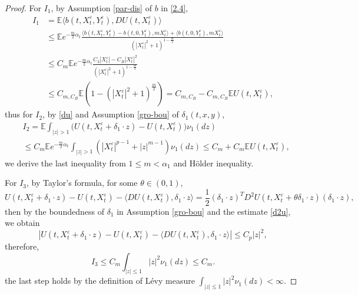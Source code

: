 \documentclass[11pt,reqno]{amsart}
\numberwithin{equation}{section}
\begin{document}
\begin{proof}
For $I_{1}$, by  Assumption \ref{par-dis} of $b$ in  \eqref{2.4},
	\begin{equation}\label{3.10}
		\begin{split}
			I_{1}&=\mathbb{E} \langle  b(t,X_{t}^{\varepsilon},Y_{t}^{\varepsilon}),DU(t,X_{t}^{\varepsilon})\rangle \\
			& \leq \mathbb{E} e^{-\frac{m}{2}\alpha_{t}} \frac{\langle  b(t,X_{t}^{\varepsilon},Y_{t}^{\varepsilon})-b(t,0,Y_{t}^{\varepsilon}),mX_{t}^{\varepsilon}\rangle  +\langle  b(t,0,Y_{t}^{\varepsilon}),mX_{t}^{\varepsilon}\rangle }{(|X_{t}^{\varepsilon}|^{2}+1)^{1-\frac{m}{2}}}\\
			&\leq C_{m}\mathbb{E}e^{-\frac{m}{2}\alpha_{t}} \frac{C_{3}|X_{t}^{\varepsilon}|-C_{B}|X_{t}^{\varepsilon}|^{2}}{(|X_{t}^{\varepsilon}|^{2}+1)^{1-\frac{m}{2}}}\\
			&\leq C_{m,C_{B}} \mathbb{E}\left( 1-(|X_{t}^{\varepsilon}|^{2}+1)^{\frac{m}{2}}\right)=C_{m,C_{B}}-C_{m,C_{B}}\mathbb{E}U(t,X_{t}^{\varepsilon}), 
		\end{split}
	\end{equation}
	thus for $I_{2}$, by \eqref{du} and  Assumption \ref{gro-bou} of $ \delta_{1}(t,x,y)$,
	\begin{equation}\label{3.11}
		\begin{split}
			&I_{2}=\mathbb{E} \int_{|z|> 1}\big( U(t,X_{t}^{\varepsilon}+\delta_{1}\cdot z)-U(t,X_{t}^{\varepsilon}) \big) \nu_{1}(dz)\\
			& \leq C_{m}\mathbb{E}e^{-\frac{m}{2}\alpha_{t}}\int_{|z|> 1}\left(|X_{t}^{\varepsilon}|^{p-1}+|z|^{m-1} \right) \nu_{1}(dz) \leq C_{m} +C_{m}\mathbb{E}U(t,X_{t}^{\varepsilon}),
		\end{split}
	\end{equation}
	we derive the last inequality from $1\leq m<\alpha_1$ and H\"{o}lder inequality. 
    
    For $I_3$, by Taylor’s formula, for some $\theta\in(0,1)$,
$$
U(t,X_t^\varepsilon+\delta_1\cdot z)-U(t,X_t^\varepsilon)-\langle DU(t,X_t^\varepsilon),\delta_1\cdot z\rangle
=\frac{1}{2}
(\delta_1\cdot z)^{T}
D^2U(t,X_t^\varepsilon+\theta\delta_1\cdot z)
(\delta_1\cdot z),
$$
then by the boundedness of $\delta_1$ in Assumption \ref{gro-bou} and the estimate \eqref{d2u}, we obtain
$$
\left|
U(t,X_t^\varepsilon+\delta_1\cdot z)-U(t,X_t^\varepsilon)
-\langle DU(t,X_t^\varepsilon),\delta_1\cdot z\rangle
\right|
\le
C_p |z|^2,
$$
therefore, 
\begin{equation}\label{3.10-1}
I_3\le C_m\int_{|z|\le1}|z|^2\nu_1(dz)
\le C_m.
\end{equation}
the last step holds by the definition of L\'evy measure $\int_{|z|\le1}|z|^2\nu_1(dz)<\infty$.
	

\end{proof}
\end{document}

